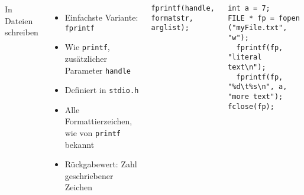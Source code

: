 \begin{frame}[fragile]
%
\begin{columns}[T]
\begin{Large}
In Dateien schreiben
\vspace{10pt}
\end{Large}
%
\begin{itemize}
\item Einfachste Variante: \texttt{fprintf}
\item Wie \texttt{printf}, zusätzlicher Parameter \texttt{handle}
\item Definiert in \texttt{stdio.h}
\item Alle Formattierzeichen, wie von \texttt{printf} bekannt
\item Rückgabewert: Zahl geschriebener Zeichen
\end{itemize}
%
\begin{codebox}[Syntax]
\begin{verbatim}
fprintf(handle, formatstr, arglist);
\end{verbatim}
\end{codebox}
%
\begin{codebox}[Beispiel]
\begin{verbatim}
int a = 7;
FILE * fp = fopen ("myFile.txt", "w");
  fprintf(fp, "literal text\n");
  fprintf(fp, "%d\t%s\n", a, "more text");
fclose(fp);
\end{verbatim}
\end{codebox}
\end{columns}
%
\end{frame}


